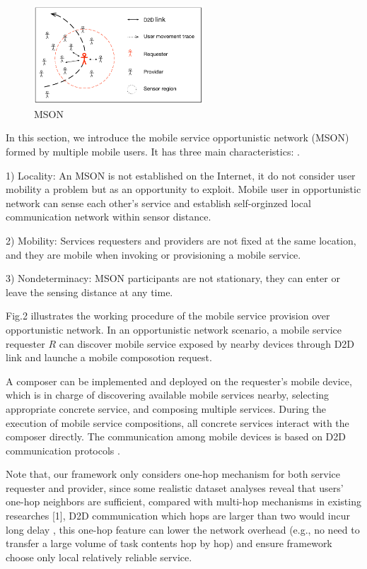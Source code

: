 \documentclass[10pt,journal,compsoc]{IEEEtran}
\begin{document}
\begin{figure}[!t]
\centering
\includegraphics[width=2.5in]{./img/fig2.jpg}
\caption{MSON}
\label{fig_mson}
\end{figure}

In this section, we introduce the mobile service opportunistic network (MSON) formed by multiple mobile users. It has three main characteristics: \cite{Deng2017}.

1) Locality: An MSON is not established on the Internet, it do not consider user mobility a problem but as an opportunity to exploit. Mobile user in opportunistic network can sense each other's service and establish self-orginzed local communication network within sensor distance.

2) Mobility: Services requesters and providers are not fixed at the same location, and they are mobile when invoking or provisioning a mobile service.

3) Nondeterminacy: MSON participants are not stationary, they can enter or leave the sensing distance at any time. 



Fig.2 illustrates the working procedure of the mobile service provision over opportunistic network. In an opportunistic network scenario, a mobile service requester $R$ can discover mobile service exposed by nearby devices through D2D link and launche a mobile composotion request. 

A composer can be implemented and deployed on the requester’s mobile device, which is in charge of discovering available mobile services nearby, selecting appropriate concrete service, and composing multiple services. During the execution of mobile service compositions, all concrete services interact with the composer directly. The communication among mobile devices is based on D2D communication protocols \cite{Deng2017}.

Note that, our framework only considers one-hop mechanism for both service requester and provider, since some realistic dataset analyses reveal that users’ one-hop neighbors are sufficient, compared with multi-hop mechanisms in existing researches \cite{chang2015progressive,karaliopoulos2015user,han2016competition,tuncay2013participant,wu2013homing,jiang2016exploiting}[1]\cite{liu2013exploring}, D2D communication which hops are larger than two would incur long delay \cite{li2014can},  this one-hop feature can lower the network overhead (e.g., no need to transfer a large volume of task contents hop by hop) and ensure framework choose only local relatively reliable service. 
\end{document}
